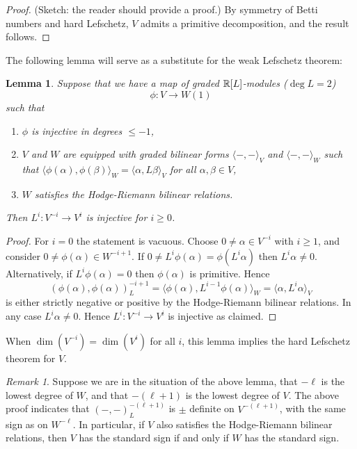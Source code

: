 \documentclass[11pt]{amsart}
\numberwithin{equation}{section}
\def\a{\alpha}
\def\b{\beta}
\def\to{\rightarrow}
\newtheorem{lem}[thm]{Lemma}
\theoremstyle{definition}
\theoremstyle{remark}
\newtheorem{remark}[thm]{Remark}
\begin{document}
\begin{proof} (Sketch: the reader should provide a proof.) By symmetry of Betti numbers and hard Lefschetz, $V$ admits a primitive decomposition, and the result follows.
\end{proof}

The following lemma will serve as a substitute
for the weak Lefschetz theorem:

\begin{lem} \label{lem: weak lefschetz substitute} Suppose that we
  have a map of graded ${\mathbb{R}}[L]$-modules ($\deg L = 2$) \[ \phi: V \to
  W(1) \] such that
 \begin{enumerate} \item $\phi$ is
injective in degrees $\le -1$, \item $V$ and $W$ are equipped with
graded bilinear forms $\langle -, - \rangle_V$ and $\langle -, - \rangle_W$ such that $\langle \phi(\a), \phi(\b) \rangle_W = \langle \a, L \b
\rangle_V$ for all $\a, \b \in V$, \item $W$ satisfies the Hodge-Riemann bilinear relations. \end{enumerate} Then $L^i : V^{-i} \to V^i$ is injective for $i\ge 0$. \end{lem}

\begin{proof} For $i=0$ the statement is vacuous. Choose $0 \ne \a \in V^{-i}$ with $i \ge 1$, and consider $0 \ne \phi(\a) \in W^{-i+1}$. If $0 \ne L^i \phi(\a) = \phi(L^i \a)$ then
$L^i \a \ne 0$. Alternatively, if $L^i \phi(\a) = 0$ then $\phi(\a)$
is primitive. Hence \[ (\phi(\a), \phi(\a))^{-i+1}_L = \langle \phi(\a), L^{i-1} \phi(\a) \rangle_W = \langle \a,
L^i \a \rangle_V \] is either strictly negative or positive by the Hodge-Riemann bilinear relations. In any case $L^i \a \ne 0$. Hence $L^i : V^{-i} \to V^i$ is injective as claimed.
\end{proof}

When $\dim(V^{-i}) = \dim(V^i)$ for all $i$, this lemma implies the hard Lefschetz theorem for $V$.

\begin{remark} \label{remark: standard sign} Suppose we are in the situation of the above lemma, that $-\ell$ is the lowest degree of $W$, and that $-(\ell+1)$ is the lowest degree
of $V$. The above proof indicates that $(-,-)^{-(\ell+1)}_L$ is $\pm$
definite on $V^{-(\ell+1)}$, with the same sign as on $W^{-\ell}$. In
particular, if $V$ also satisfies the Hodge-Riemann
bilinear relations, then $V$ has the standard sign if and only if $W$
has the standard sign. \end{remark}
\end{document}
